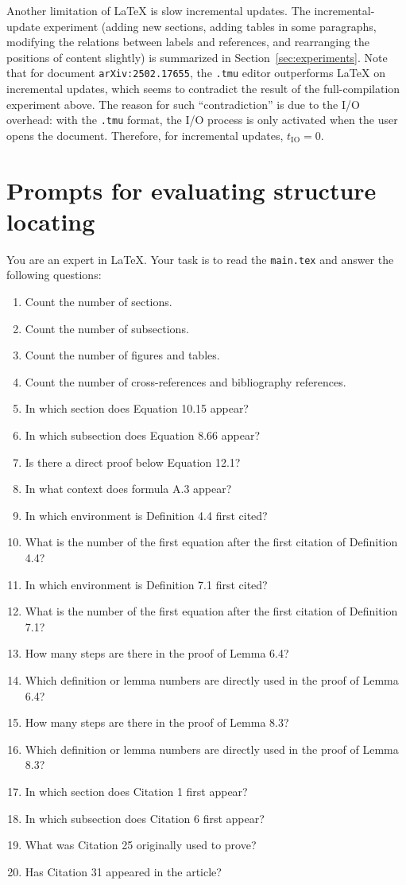 Another limitation of \LaTeX{} is slow incremental updates. The incremental-update experiment (adding new sections, adding tables in some paragraphs, modifying the relations between labels and references, and rearranging the positions of content slightly) is summarized in Section~\ref{sec:experiments}. Note that for document \texttt{arXiv:2502.17655}, the \texttt{.tmu} editor outperforms \LaTeX{} on incremental updates, which seems to contradict the result of the full-compilation experiment above. The reason for such ``contradiction'' is due to the I/O overhead: with the \texttt{.tmu} format, the I/O process is only activated when the user opens the document. Therefore, for incremental updates, $t_{\text{IO}}=0$.

\section{Prompts for evaluating structure locating}
\label{app:20ques}

You are an expert in \LaTeX{}. Your task is to read the \texttt{main.tex} and answer the following questions:

\begin{enumerate}
    \item Count the number of sections.
    \item Count the number of subsections.
    \item Count the number of figures and tables.
    \item Count the number of cross-references and bibliography references.
    \item In which section does Equation 10.15 appear?
    \item In which subsection does Equation 8.66 appear?
    \item Is there a direct proof below Equation 12.1?
    \item In what context does formula A.3 appear?
    \item In which environment is Definition 4.4 first cited?
    \item What is the number of the first equation after the first citation of Definition 4.4?
    \item In which environment is Definition 7.1 first cited?
    \item What is the number of the first equation after the first citation of Definition 7.1?
    \item How many steps are there in the proof of Lemma 6.4?
    \item Which definition or lemma numbers are directly used in the proof of Lemma 6.4?
    \item How many steps are there in the proof of Lemma 8.3?
    \item Which definition or lemma numbers are directly used in the proof of Lemma 8.3?
    \item In which section does Citation 1 first appear?
    \item In which subsection does Citation 6 first appear?
    \item What was Citation 25 originally used to prove?
    \item Has Citation 31 appeared in the article?
\end{enumerate}
